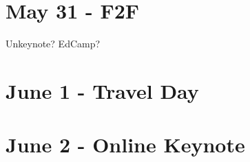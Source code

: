 \documentclass[
]{book}
\begin{document}
\hypertarget{may-31---f2f}{%
\chapter{May 31 - F2F}\label{may-31---f2f}}

Unkeynote? EdCamp?

\hypertarget{june-1---travel-day}{%
\chapter{June 1 - Travel Day}\label{june-1---travel-day}}

\hypertarget{june-2---online-keynote}{%
\chapter{June 2 - Online Keynote}\label{june-2---online-keynote}}

  
\end{document}
